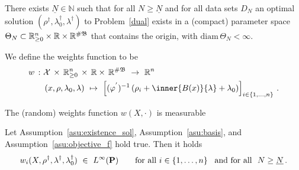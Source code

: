 



\begin{assumption}
  \label{asu:existence_sol}
  There exists $\underline{N}\in\mathbb{N}$ such that 
  for all $N\ge \underline{N}$ and for all data sets $D_N$
  an optimal solution
  $(\rho^\dagger,\lambda_0^\dagger,\lambda^\dagger)$
  to Problem~\ref{dual} exists in a (compact) parameter space 
  $\Theta_N
  \subset
  \mathbb{R}^n_{\ge 0}
  \times
  \mathbb{R}
  \times
  \mathbb{R}^{\#\mathfrak{B}}
  $ that contains the origin, with
  $\mathrm{diam}\,\Theta_N<\infty$.
\end{assumption}
\begin{definition}
  \label{def:weights_function}
  We define the weights function to be
\begin{align*}
  w
  \ 
  \colon
  &
  \mathcal{X}
  \,
  \times
  \,
  \R^n_{\ge 0}
  \,
  \times
  \,
  \R
  \times
  \,
  \R^{\#\mathfrak{B}}
  \ 
  \to
  \ 
  \R^n
  \\
  &
  \left( 
  x
  ,
  \rho
  ,
  \lambda_0
  ,
  \lambda
  \right)
  \ 
  \mapsto
  \ 
  \left[ 
    (
    \varphi^{'}
    )^{-1}
    \left( 
     \rho_i 
     +
      \inner{B(x)}{\lambda}
      +
      \lambda_0
    \right)
  \right]_{i\in \left\{ 1, \ldots,n \right\}}
    \,.
\end{align*}
\end{definition}
\begin{lemma}
  The (random) weights function $w(X,\cdot)$ is measurable
\end{lemma}
\begin{lemma}
  \label{weights_l_inf}
  Let Assumption~\ref{asu:existence_sol}, 
  Assumption~\ref{asu:basis},
  and Assumption~\ref{asu:objective_f} hold true.
  Then it holds 
  \begin{gather*}
  w_i(X,\rho^\dagger,\lambda^\dagger,\lambda_0^\dagger)
  \ 
  \in
  \ 
  L^\infty(\P)
  \qquad
  \text{for all}
  \ 
  i\in \left\{ 1,\ldots,n \right\}
  \ 
  \text{
    and
  for all 
  }\ 
  N\ge \underline{N}
  \,.
  \end{gather*}
\end{lemma}
